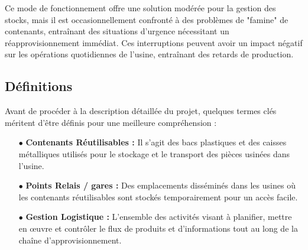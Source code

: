 Ce mode de fonctionnement offre une solution modérée pour la gestion des stocks, mais il est occasionnellement confronté à des problèmes de "famine" de contenants, entraînant des situations d'urgence nécessitant un réapprovisionnement immédiat. Ces interruptions peuvent avoir un impact négatif sur les opérations quotidiennes de l'usine, entraînant des retards de production.

\subsection{Définitions}

Avant de procéder à la description détaillée du projet, quelques termes clés méritent d'être définis pour une meilleure compréhension :\\

\begin{itemize}
    \item[$\bullet$] \textbf{Contenants Réutilisables :} Il s'agit des bacs plastiques et des caisses métalliques utilisés pour le stockage et le transport des pièces usinées dans l'usine.
    \item[$\bullet$] \textbf{Points Relais / gares :} Des emplacements disséminés dans les usines où les contenants réutilisables sont stockés temporairement pour un accès facile.
    \item[$\bullet$] \textbf{Gestion Logistique :} L'ensemble des activités visant à planifier, mettre en œuvre et contrôler le flux de produits et d'informations tout au long de la chaîne d'approvisionnement.\\
\end{itemize}
